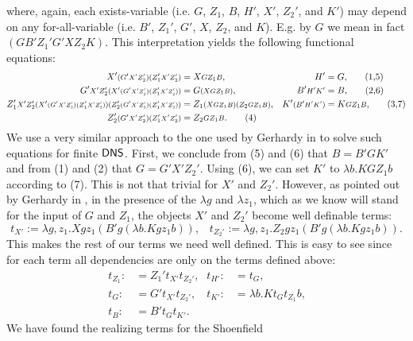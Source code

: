 where, again, each exists-variable (i.e. $G$, $Z_1$, $B$, $H'$, $X'$, $Z_2'$, 
and $K'$) 
may depend on any 
for-all-variable (i.e. $B'$, $Z_1'$, $G'$, $X$, $Z_2$, and $K$). E.g. by $G$ 
we mean in 
fact $(GB'Z_1'G'XZ_2K)$.  This interpretation
yields the following functional equations:
\setcounter{equation}{0}
\begin{align*}
      X'\args{(G'\args{X'Z_2'})(Z_1'\args{X'Z_2'})}&=
                 X\args{GZ_1B} \text{,}&                        %
     H'&=G \text{,}\tag{1,5}\\                                                %
     G'\args{X'Z_2'(X'\args{(G'\args{X'Z_2'})(Z_1'\args{X'Z_2'})})}&=
                G\args{(X\args{GZ_1B})}\text{,}&         %
     B'\args{H'K'}&=B \text{,}\tag{2,6}\\                                               %
     Z_1'\args{X'Z_2'(X'\args{(G'\args{X'Z_2'})(Z_1'\args{X'Z_2'})})
   (Z_2'\args{(G'\args{X'Z_2'})(Z_1'\args{X'Z_2'})})}&=
                Z_1\args{(X\args{GZ_1B})(Z_2\args{GZ_1B})} \text{,}&    %
     K'\args{(B'\args{H'K'})}&=K\args{GZ_1B}\text{,}\tag{3,7}\\      %
     Z_2'\args{(G'\args{X'Z_2'})(Z_1'\args{X'Z_2'})}&=
                Z_2\args{GZ_1B} \text{.} \tag{4}                    %
\end{align*}
We use a very similar approach to the one used by Gerhardy in 
\cite{GerhardyX} to
solve such equations for finite $\textsf{\upshape DNS}$. First, we conclude from (5) and (6)
that $B=B'GK'$ and from (1) and (2) that $G=G'X'Z_2'$. Using (6), we can set 
$K'$ to $\lambda b.KGZ_1b$ according to (7). This is not that trivial
for $X'$ and $Z_2'$. However, as pointed out by Gerhardy in \cite{GerhardyX}, 
in the presence of the $\lambda g$ and $\lambda z_1$, which as we know will 
stand for the input of $G$ and $Z_1$, the objects  $X'$ and 
$Z_2'$ become well definable terms:
\[
t_{X'}:=\lambda g,z_1.Xgz_1(B'g(\lambda b.Kgz_1b))\text{,}\quad
t_{Z_2'}:=\lambda g,z_1.Z_2gz_1(B'g(\lambda b.Kgz_1b))\text{.}
\]
This makes the rest of our terms we need  well defined. This is easy
to see since for each term all dependencies are only on
the terms defined above:
\begin{align*} 
t_{Z_1}:&=Z_1't_{X'}t_{Z_2'}\text{,}&
t_{H'}:&=t_{G}\text{,}\\
t_{G}:&=G't_{X'}t_{Z_2'}\text{,}&
t_{K'}:&=\lambda b.Kt_{G}t_{Z_1}b\text{,}\\
t_{B}:&=B't_{G}t_{K'}\text{.}
\end{align*} 
We have found the realizing terms for the Shoenfield 

